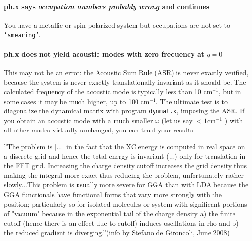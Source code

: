 \documentclass[12pt,a4paper]{article}
\begin{document}
\paragraph{ph.x says {\em occupation numbers probably wrong} and
 continues} You have a
metallic or spin-polarized system but occupations are not set to 
\texttt{'smearing'}.

\paragraph{ph.x does not yield acoustic modes with zero frequency at $q=0$}
This may not be an error: the Acoustic Sum Rule (ASR) is never exactly
verified, because the system is never exactly translationally
invariant as it should be.  The calculated frequency of the acoustic
mode is typically less than 10 cm$^{-1}$, but in some cases it may be
much higher, up to 100 cm$^{-1}$. The ultimate test is to diagonalize
the dynamical matrix with program \texttt{dynmat.x}, imposing the ASR. If you
obtain an acoustic mode with a much smaller $\omega$ (let us say 
$< 1 \mbox{cm}^{-1}$ ) 
with all other modes virtually unchanged, you can trust your results.

''The problem is [...] in the fact that the XC 
energy is computed in real space on a discrete grid and hence the
total energy is invariant (...) only for translation in the FFT
grid. Increasing the charge density cutoff increases the grid density
thus making the integral more exact thus reducing the problem,
unfortunately rather slowly...This problem is usually more severe for
GGA  than with LDA because the GGA functionals have functional forms
that vary more strongly with the position; particularly so for
isolated molecules or system with significant portions of "vacuum"
because in the exponential tail of the charge density a) the finite
cutoff  (hence there is an effect due to cutoff) induces oscillations
in rho and b) the reduced gradient is diverging.''(info by Stefano de
Gironcoli, June 2008) 
\end{document}
